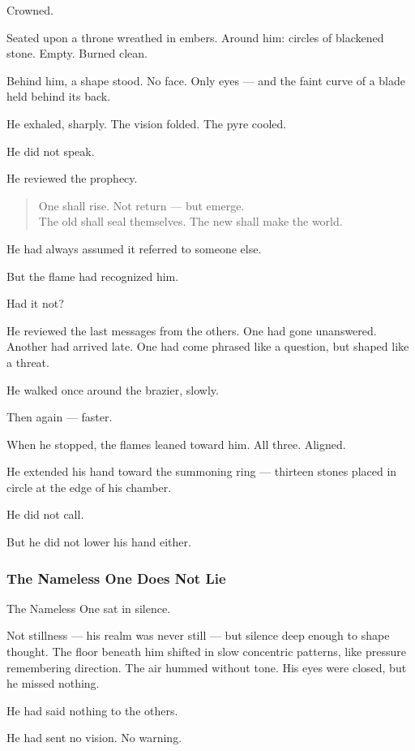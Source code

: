 \documentclass[12pt]{article}
\begin{document}
Crowned.

Seated upon a throne wreathed in embers. Around him: circles of blackened stone. Empty. Burned clean.

Behind him, a shape stood. No face. Only eyes — and the faint curve of a blade held behind its back.

He exhaled, sharply. The vision folded. The pyre cooled.

He did not speak.

He reviewed the prophecy.

\begin{quote}
One shall rise. Not return — but emerge.\\
The old shall seal themselves. The new shall make the world.
\end{quote}

He had always assumed it referred to someone else.

But the flame had recognized him.

Had it not?

He reviewed the last messages from the others. One had gone unanswered. Another had arrived late. One had come phrased like a question, but shaped like a threat.

He walked once around the brazier, slowly.

Then again — faster.

When he stopped, the flames leaned toward him. All three. Aligned.

He extended his hand toward the summoning ring — thirteen stones placed in circle at the edge of his chamber.

He did not call.

But he did not lower his hand either.


\dotfill

\subsubsection{The Nameless One Does Not Lie}

The Nameless One sat in silence.

Not stillness — his realm was never still — but silence deep enough to shape thought. The floor beneath him shifted in slow concentric patterns, like pressure remembering direction. The air hummed without tone. His eyes were closed, but he missed nothing.

He had said nothing to the others.

He had sent no vision. No warning.
\end{document}
